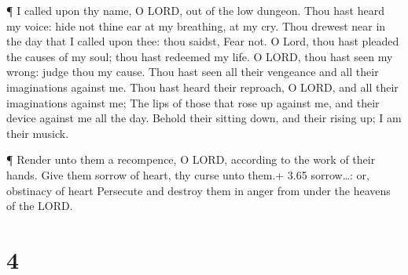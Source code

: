  ¶ I called upon thy name, O LORD, out of the low dungeon.
 Thou hast heard my voice: hide not thine ear at my
breathing, at my cry.  Thou drewest near in the day that I
called upon thee: thou saidst, Fear not.  O Lord, thou hast
pleaded the causes of my soul; thou hast redeemed my life. 
O LORD, thou hast seen my wrong: judge thou my cause.  Thou
hast seen all their vengeance and all their imaginations against me.
 Thou hast heard their reproach, O LORD, and all their
imaginations against me;  The lips of those that rose up
against me, and their device against me all the day. 
Behold their sitting down, and their rising up; I am their musick.

 ¶ Render unto them a recompence, O LORD, according to the
work of their hands.  Give them sorrow of heart, thy curse
unto them.+ 3.65 sorrow\ldots: or, obstinacy of heart 
Persecute and destroy them in anger from under the heavens of the LORD.

\hypertarget{section-3}{%
\section{4}\label{section-3}}


